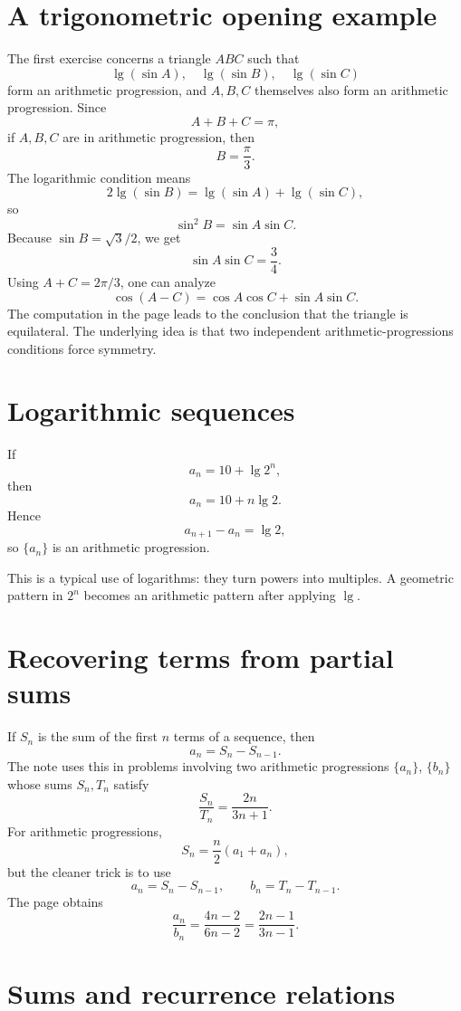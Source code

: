 
\section{A trigonometric opening example}

The first exercise concerns a triangle \(ABC\) such that
\[
  \lg(\sin A),\quad \lg(\sin B),\quad \lg(\sin C)
\]
form an arithmetic progression, and \(A,B,C\) themselves also form an arithmetic progression.  Since
\[
  A+B+C=\pi,
\]
if \(A,B,C\) are in arithmetic progression, then
\[
  B=\frac\pi3.
\]
The logarithmic condition means
\[
  2\lg(\sin B)=\lg(\sin A)+\lg(\sin C),
\]
so
\[
  \sin^2B=\sin A\sin C.
\]
Because \(\sin B=\sqrt3/2\), we get
\[
  \sin A\sin C=\frac34.
\]
Using \(A+C=2\pi/3\), one can analyze
\[
  \cos(A-C)=\cos A\cos C+\sin A\sin C.
\]
The computation in the page leads to the conclusion that the triangle is equilateral.  The underlying idea is that two independent arithmetic-progressions conditions force symmetry.

\section{Logarithmic sequences}

If
\[
  a_n=10+\lg 2^n,
\]
then
\[
  a_n=10+n\lg2.
\]
Hence
\[
  a_{n+1}-a_n=\lg2,
\]
so \(\{a_n\}\) is an arithmetic progression.

This is a typical use of logarithms: they turn powers into multiples.  A geometric pattern in \(2^n\) becomes an arithmetic pattern after applying \(\lg\).

\section{Recovering terms from partial sums}

If \(S_n\) is the sum of the first \(n\) terms of a sequence, then
\[
  a_n=S_n-S_{n-1}.
\]
The note uses this in problems involving two arithmetic progressions \(\{a_n\}\), \(\{b_n\}\) whose sums \(S_n,T_n\) satisfy
\[
  \frac{S_n}{T_n}=\frac{2n}{3n+1}.
\]
For arithmetic progressions,
\[
  S_n=\frac n2(a_1+a_n),
\]
but the cleaner trick is to use
\[
  a_n=S_n-S_{n-1},\qquad b_n=T_n-T_{n-1}.
\]
The page obtains
\[
  \frac{a_n}{b_n}=\frac{4n-2}{6n-2}=\frac{2n-1}{3n-1}.
\]

\section{Sums and recurrence relations}

